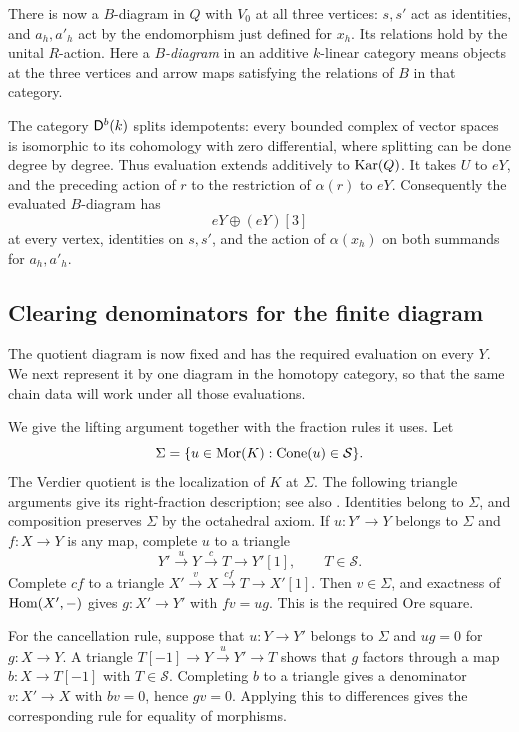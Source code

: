 There is now a $B$-diagram in $Q$ with $V_0$ at all three vertices:
$s,s'$ act as identities, and $a_h,a'_h$ act by the endomorphism
just defined for $x_h$.  Its relations hold by the unital
$R$-action.  Here a \emph{$B$-diagram} in an additive $k$-linear
category means objects at the three vertices and arrow maps satisfying
the relations of $B$ in that category.

The category $\mathsf D^b(k)$ splits idempotents: every bounded complex of
vector spaces is isomorphic to its cohomology with zero differential,
where splitting can be done degree by degree.  Thus evaluation extends
additively to $\operatorname{Kar}(Q)$.  It takes $U$ to $eY$, and the preceding
action of $r$ to the restriction of $\alpha(r)$ to $eY$.
Consequently the evaluated $B$-diagram has
\begin{equation}\label{eq:target-evaluation}
  eY\oplus(eY)[3]
\end{equation}
at every vertex, identities on $s,s'$, and the action of
$\alpha(x_h)$ on both summands for $a_h,a'_h$.

\subsection{Clearing denominators for the finite diagram}

The quotient diagram is now fixed and has the required evaluation on
every $Y$. We next represent it by one diagram in the homotopy category,
so that the same chain data will work under all those evaluations.

We give the lifting argument together with the fraction rules it uses.
Let
\[
  \Sigma=\{u\in\operatorname{Mor}(K):\operatorname{Cone}(u)\in\mathcal S\}.
\]
The Verdier quotient is the localization of $K$ at $\Sigma$.
The following triangle arguments give its right-fraction description;
see also \cite[Section 13.6]{StacksProject}.
Identities belong to $\Sigma$, and composition preserves $\Sigma$
by the octahedral axiom.  If $u:Y'\to Y$ belongs to $\Sigma$ and
$f:X\to Y$ is any map, complete $u$ to a triangle
\[
  Y'\xrightarrow{u}Y\xrightarrow{c}T\longrightarrow Y'[1],
  \qquad T\in\mathcal S.
\]
Complete $cf$ to a triangle
$X'\xrightarrow{v}X\xrightarrow{cf}T\to X'[1]$.
Then $v\in\Sigma$, and exactness of $\operatorname{Hom}(X',-)$ gives
$g:X'\to Y'$ with $fv=ug$.  This is the required Ore square.

For the cancellation rule, suppose that $u:Y\to Y'$ belongs to
$\Sigma$ and $ug=0$ for $g:X\to Y$.
A triangle $T[-1]\to Y\xrightarrow{u}Y'\to T$ shows that $g$
factors through a map $b:X\to T[-1]$ with $T\in\mathcal S$.
Completing $b$ to a triangle gives a denominator $v:X'\to X$
with $bv=0$, hence $gv=0$.  Applying this to differences gives
the corresponding rule for equality of morphisms.


